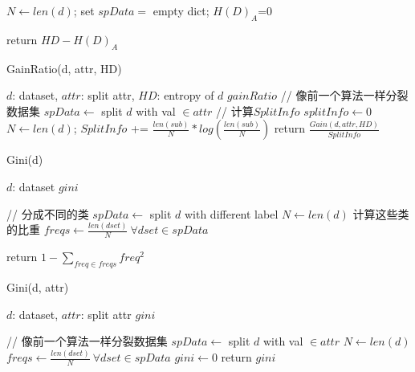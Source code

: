 \documentclass[11pt]{article}
\begin{document}
\begin{CJK}{UTF8}{gbsn}
\begin{algorithm}
\begin{algorithmic}
\STATE $N \gets len(d)$;
\STATE set $spData = $ empty dict;
\ENDFOR
\STATE $H(D)_A$=0

\ENDFOR
\STATE return $HD-H(D)_A$
\end{algorithmic}
\end{algorithm}


\begin{algorithm}
\caption{GainRatio(d, attr, HD)}\label{alg3}
\begin{algorithmic}
\REQUIRE $d$: dataset, $attr$: split attr, $HD$: entropy of $d$
\ENSURE $gainRatio$
\STATE // 像前一个算法一样分裂数据集
\STATE $spData \gets $ split $d$ with val $\in attr$
\STATE // 计算$SplitInfo$
\STATE $splitInfo \gets 0$
\STATE $N \gets len(d)$;
\STATE $SplitInfo$ += $\frac{len(sub)}{N}*log(\frac{len(sub)}{N})$
\ENDFOR
\STATE return $\frac{Gain(d,attr,HD)}{SplitInfo}$
\end{algorithmic}
\end{algorithm}


\begin{algorithm}
\caption{Gini(d)}\label{alg4}
\begin{algorithmic}
\REQUIRE $d$: dataset
\ENSURE $gini$

\STATE // 分成不同的类
\STATE $spData \gets $ split $d$ with different label
\STATE $N \gets len(d)$
\STATE 计算这些类的比重
\STATE $freqs \gets \frac{len(dset)}{N}\ \forall dset \in spData$ \newline

\STATE return $1-\sum_{freq\in freqs}{freq^2}$
\end{algorithmic}
\end{algorithm}

\begin{algorithm}
\caption{Gini(d, attr)}\label{alg5}
\begin{algorithmic}
\REQUIRE $d$: dataset, $attr$: split attr
\ENSURE $gini$

\STATE // 像前一个算法一样分裂数据集
\STATE $spData \gets $ split $d$ with val $\in attr$
\STATE $N \gets len(d)$
\STATE $freqs \gets \frac{len(dset)}{N}\ \forall dset \in spData$ \newline
\STATE $gini \gets 0$
\ENDFOR
\STATE return $gini$
\end{algorithmic}
\end{algorithm}


\end{CJK}
\end{document}
